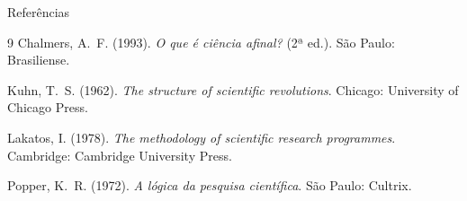 \documentclass[aspectratio=169]{beamer}
\begin{document}
\begin{frame}[allowframebreaks]{Referências}
\begin{thebibliography}{9}
Chalmers, A.\ F. (1993).
\newblock \emph{O que é ciência afinal?} (2ª ed.).
\newblock São Paulo: Brasiliense.

Kuhn, T.\ S. (1962).
\newblock \emph{The structure of scientific revolutions}.
\newblock Chicago: University of Chicago Press.

Lakatos, I. (1978).
\newblock \emph{The methodology of scientific research programmes}.
\newblock Cambridge: Cambridge University Press.

Popper, K.\ R. (1972).
\newblock \emph{A lógica da pesquisa científica}.
\newblock São Paulo: Cultrix.
\end{thebibliography}
\end{frame}
\end{document}
